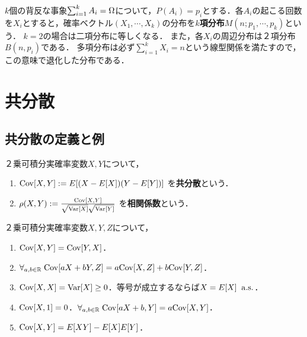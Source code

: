 \documentclass[uplatex,dvipdfmx]{jsreport}
\begin{document}
\begin{example}
    $k$個の背反な事象$\sum^k_{i=1}A_i=\Omega$について，$P(A_i)=p_i$とする．各$A_i$の起こる回数を$X_i$とすると，確率ベクトル$(X_1,\cdots,X_k)$の分布を\textbf{$k$項分布}$M(n;p_1,\cdots,p_k)$という．
    $k=2$の場合は二項分布に等しくなる．
    また，各$X_i$の周辺分布は２項分布$B(n,p_i)$である．
    多項分布は必ず$\sum_{i=1}^kX_i=n$という線型関係を満たすので，この意味で退化した分布である．
\end{example}

\section{共分散}

\subsection{共分散の定義と例}

\begin{definition}
    ２乗可積分実確率変数$X,Y$について，
    \begin{enumerate}
        \item 
        $\mathrm{Cov}[X,Y]:=E[(X-E[X])(Y-E[Y])]$
        を\textbf{共分散}という．
        \item $\rho(X,Y):=\frac{\mathrm{Cov}[X,Y]}{\sqrt{\mathrm{Var}[X]}\sqrt{\mathrm{Var}[Y]}}$
        を\textbf{相関係数}という．
    \end{enumerate}
\end{definition}

\begin{proposition}\label{prop-covariance-formula}
    ２乗可積分実確率変数$X,Y,Z$について，
    \begin{enumerate}
        \item $\mathrm{Cov}[X,Y]=\mathrm{Cov}[Y,X]$．
        \item $\forall_{a,b\in\mathbb{R}}\;\mathrm{Cov}[aX+bY,Z]=a\mathrm{Cov}[X,Z]+b\mathrm{Cov}[Y,Z]$．
        \item $\mathrm{Cov}[X,X]=\mathrm{Var}[X]\ge 0$．等号が成立するならば$X=E[X]\;\;\mathrm{a.s.}$．
        \item $\mathrm{Cov}[X,1]=0$．$\forall_{a,b\in\mathbb{R}}\;\mathrm{Cov}[aX+b,Y]=a\mathrm{Cov}[X,Y]$．
        \item $\mathrm{Cov}[X,Y]=E[XY]-E[X]E[Y]$．
    \end{enumerate}
\end{proposition}
\end{document}
